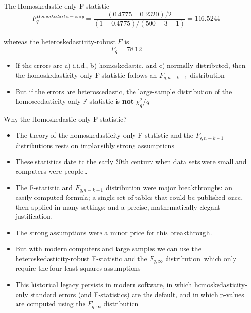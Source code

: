 \documentclass[notes,10pt, aspectratio=169]{beamer}
\begin{document}
\begin{frame}{The Homoskedastic-only F-statistic}
\begin{equation*}
    F^{Homoskedastic-only}_q=\frac{(0.4775-0.2320)/2}{(1-0.4775)/(500-3-1)}=116.5244
\end{equation*}
\\[1em] whereas the heteroskedasticity-robust $F$ is
\begin{equation*}
    F_q=78.12
\end{equation*}
\begin{itemize}
    \item If the errors are a) i.i.d., b) homoskedastic, and c) normally distributed, then the homoskedasticity-only F-statistic follows an $F_{q,n-k-1}$ distribution
    \item But if the errors are heteroscedastic, the large-sample distribution of the homoscedasticity-only F-statistic is \textbf{not} $\chi^2_q/q$
\end{itemize}


\end{frame}


\begin{frame}{Why the Homoskedastic-only F-statistic?}
\begin{itemize}
    \item The theory of the homoskedasticity-only F-statistic and the $F_{q,n-k-1}$ distributions rests on implausibly strong assumptions
    \item These statistics date to the early 20th century when data sets were small and computers were people…
    \item The F-statistic and $F_{q,n-k-1}$ distribution were major breakthroughs: an easily computed formula; a single set of tables that could be published once, then applied in many settings; and a precise, mathematically elegant justification.
    \item The strong assumptions were a minor price for this breakthrough.
    \item But with modern computers and large samples we can use the heteroskedasticity-robust F-statistic and the $F_{q,\infty}$ distribution, which only require the four least squares assumptions
    \item This historical legacy persists in modern software, in which homoskedasticity-only standard errors (and F-statistics) are the default, and in which p-values are computed using the $F_{q,\infty}$ distribution
\end{itemize}
\end{frame}
\end{document}
